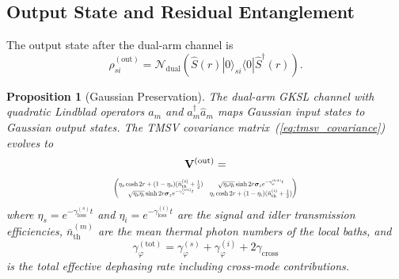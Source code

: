 \documentclass[journal]{IEEEtran}
\newtheorem{proposition}{Proposition}
\begin{document}
\subsection{Output State and Residual Entanglement}

The output state after the dual-arm channel is
\begin{equation}\label{eq:output_state}
\rho_{si}^{(\text{out})} = \mathcal{N}_{\text{dual}}\left(\hat{S}(r)|0\rangle_{si}\langle 0|\hat{S}^\dagger(r)\right).
\end{equation}

\begin{proposition}[Gaussian Preservation]\label{prop:gaussian}
The dual-arm GKSL channel with quadratic Lindblad operators $\hat{a}_m$ and $\hat{a}_m^\dagger\hat{a}_m$ maps Gaussian input states to Gaussian output states. The TMSV covariance matrix~(\ref{eq:tmsv_covariance}) evolves to
\begin{equation}\label{eq:output_covariance}
\begin{gathered}
\mathbf{V}^{(\text{out})} =\\[2pt]
\resizebox{0.48\textwidth}{!}{$\displaystyle\begin{pmatrix}
\eta_s \cosh 2r + (1-\eta_s)(\bar{n}_{\text{th}}^{(s)} + \tfrac{1}{2}) & \sqrt{\eta_s\eta_i}\sinh 2r \boldsymbol{\sigma}_z e^{-\gamma_{\varphi}^{(\text{tot})}t}  \\
\sqrt{\eta_s\eta_i}\sinh 2r \boldsymbol{\sigma}_z e^{-\gamma_{\varphi}^{(\text{tot})}t}   & \eta_i \cosh 2r + (1-\eta_i)(\bar{n}_{\text{th}}^{(i)} + \tfrac{1}{2})
\end{pmatrix}$}
\end{gathered}
\end{equation}
where $\eta_s = e^{-\gamma_{\text{loss}}^{(s)}t}$ and $\eta_i = e^{-\gamma_{\text{loss}}^{(i)}t}$ are the signal and idler transmission efficiencies, $\bar{n}_{\text{th}}^{(m)}$ are the mean thermal photon numbers of the local baths, and
\begin{equation}\label{eq:total_dephasing}
\gamma_{\varphi}^{(\text{tot})} = \gamma_{\varphi}^{(s)} + \gamma_{\varphi}^{(i)} + 2\gamma_{\text{cross}}
\end{equation}
is the total effective dephasing rate including cross-mode contributions.
\end{proposition}
\end{document}
